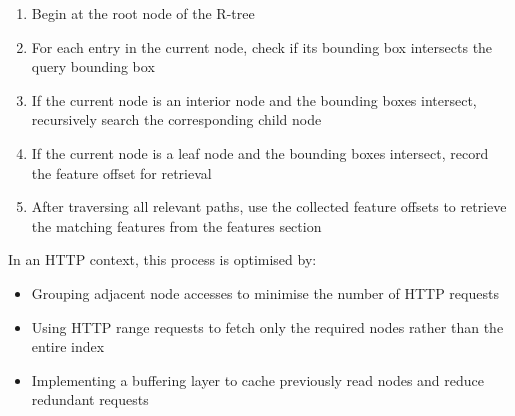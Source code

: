 \begin{enumerate}
    \item Begin at the root node of the R-tree
    \item For each entry in the current node, check if its bounding box intersects the query bounding box
    \item If the current node is an interior node and the bounding boxes intersect, recursively search the corresponding child node
    \item If the current node is a leaf node and the bounding boxes intersect, record the feature offset for retrieval
    \item After traversing all relevant paths, use the collected feature offsets to retrieve the matching features from the features section
\end{enumerate}

In an HTTP context, this process is optimised by:

\begin{itemize}
    \item Grouping adjacent node accesses to minimise the number of HTTP requests
    \item Using HTTP range requests to fetch only the required nodes rather than the entire index
    \item Implementing a buffering layer to cache previously read nodes and reduce redundant requests
\end{itemize}




